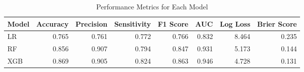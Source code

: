 \begin{table}[H]\centering
\caption{Performance Metrics for Each Model}
\label{Table 3 :performance_metrics}
\begin{tabular}{lrrrrrrr}
\toprule
Model & Accuracy & Precision & Sensitivity & F1 Score & AUC & Log Loss & Brier Score \\
\midrule
LR & 0.765 & 0.761 & 0.772 & 0.766 & 0.832 & 8.464 & 0.235 \\
RF & 0.856 & 0.907 & 0.794 & 0.847 & 0.931 & 5.173 & 0.144 \\
XGB & 0.869 & 0.905 & 0.824 & 0.863 & 0.946 & 4.728 & 0.131 \\
\bottomrule
\end{tabular}
\end{table}
